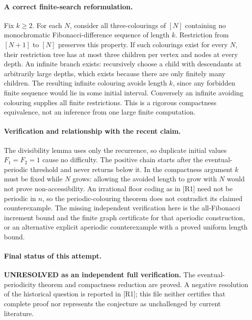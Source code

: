 \documentclass[11pt,a4paper]{article}
\begin{document}
\paragraph{A correct finite-search reformulation.}
Fix $k\ge2$. For each $N$, consider all three-colourings of $[N]$
containing no monochromatic Fibonacci-difference sequence of length
$k$. Restriction from $[N+1]$ to $[N]$ preserves this property.
If such colourings exist for every $N$, their restriction tree has
at most three children per vertex and nodes at every depth. An
infinite branch exists: recursively choose a child with descendants
at arbitrarily large depths, which exists because there are only
finitely many children. The resulting infinite colouring avoids
length $k$, since any forbidden finite sequence would lie in some
initial interval. Conversely an infinite avoiding colouring supplies
all finite restrictions. This is a rigorous compactness equivalence,
not an inference from one large finite computation.

\paragraph{Verification and relationship with the recent claim.}
The divisibility lemma uses only the recurrence, so duplicate initial
values $F_1=F_2=1$ cause no difficulty. The positive chain starts after
the eventual-periodic threshold and never returns below it. In the
compactness argument $k$ must be fixed while $N$ grows: allowing the
avoided length to grow with $N$ would not prove non-accessibility.
An irrational floor coding as in [R1] need not be periodic in $n$,
so the periodic-colouring theorem does not contradict its claimed
counterexample. The missing independent verification here is the
all-Fibonacci increment bound and the finite graph certificate for
that aperiodic construction, or an alternative explicit aperiodic
counterexample with a proved uniform length bound.

\paragraph{Final status of this attempt.}
\textbf{UNRESOLVED as an independent full verification.} The eventual-
periodicity theorem and compactness reduction are proved. A negative
resolution of the historical question is reported in [R1]; this file
neither certifies that complete proof nor represents the conjecture
as unchallenged by current literature.
\end{document}

